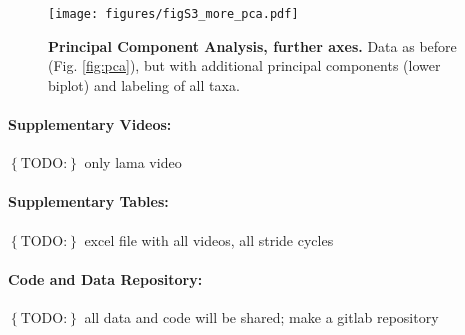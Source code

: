 \documentclass[10pt, a4paper]{article}
\newcommand{\todo}[1]{\colorbox{terracotta!30!yellow}{\footnotesize{$\left\lbrace\text{TODO:}\right\rbrace$ }#1\normalsize}}
\begin{document}
\begin{figure}[pt]
\texttt{[image: figures/figS3\_more\_pca.pdf]}
\caption[Further PC Axes]{\textbf{Principal Component Analysis, further axes.} Data as before (Fig. \ref{fig:pca}), but with additional principal components (lower biplot) and labeling of all taxa.
 }
\label{fig:more_pca}
\end{figure}



\paragraph{Supplementary Videos:} \todo{only lama video} %

\paragraph{Supplementary Tables:} \todo{excel file with all videos, all stride cycles}

\paragraph{Code and Data Repository:} \todo{all data and code will be shared; make a gitlab repository}
\end{document}
